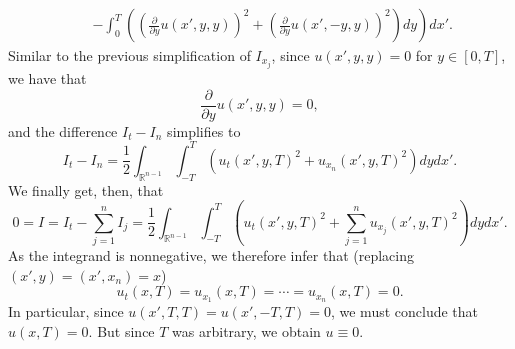 \documentclass{article}
\begin{document}
\begin{enumerate}
\begin{eqnarray*}
&   & \ \left. - \int_0^T \left( \left( \frac{\partial}{\partial y} u(x',y,y) \right)^2 + \left( \frac{\partial}{\partial y} u(x',-y,y) \right)^2 \right) dy \right) dx'.
\end{eqnarray*}
Similar to the previous simplification of \(I_{x_j}\), since \(u(x',y,y) = 0\) for \(y \in [0,T]\), we have that
\[\frac{\partial}{\partial y} u(x',y,y) = 0,\]
and the difference \(I_t - I_n\) simplifies to
\[I_t - I_n = \frac{1}{2} \int_{\mathbb{R}^{n - 1}} \int_{-T}^T \left( u_t(x',y,T)^2 + u_{x_n}(x',y,T)^2 \right) dy dx'.\]
We finally get, then, that
\[0 = I = I_t - \sum_{j = 1}^n I_j = \frac{1}{2} \int_{\mathbb{R}^{n - 1}} \int_{-T}^T \left( u_t(x',y,T)^2 + \sum_{j = 1}^n u_{x_j}(x',y,T)^2 \right) dy dx'.\]
As the integrand is nonnegative, we therefore infer that (replacing \((x',y) = (x',x_n) = x\))
\[u_t(x,T) = u_{x_1}(x,T) = \cdots = u_{x_n}(x,T) = 0.\]
In particular, since \(u(x',T,T) = u(x',-T,T) = 0\), we must conclude that \(u(x,T) = 0\).  But since \(T\) was arbitrary, we obtain \(u \equiv 0\).



\end{enumerate}
\end{document}
